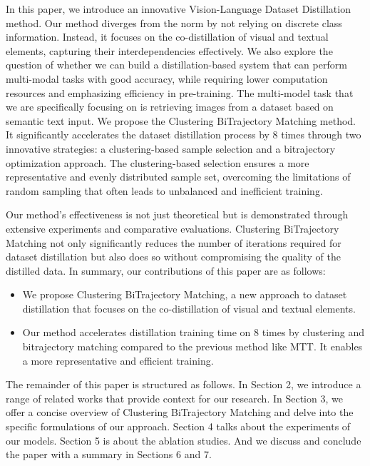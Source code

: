 \documentclass[sigconf, nonacm]{acmart}
\begin{document}
In this paper, we introduce an innovative Vision-Language Dataset Distillation method. Our method diverges from the norm by not relying on discrete class information. Instead, it focuses on the co-distillation of visual and textual elements, capturing their interdependencies effectively. We also explore the question of whether we can build a distillation-based system that can perform multi-modal tasks with good accuracy, while requiring lower computation resources and emphasizing efficiency in pre-training. The multi-model task that we are specifically focusing on is retrieving images from a dataset based on semantic text input. We propose the Clustering BiTrajectory Matching method. It significantly accelerates the dataset distillation process by 8 times through two innovative strategies: a clustering-based sample selection and a bitrajectory optimization approach. The clustering-based selection ensures a more representative and evenly distributed sample set, overcoming the limitations of random sampling that often leads to unbalanced and inefficient training.

Our method's effectiveness is not just theoretical but is demonstrated through extensive experiments and comparative evaluations. Clustering BiTrajectory Matching not only significantly reduces the number of iterations required for dataset distillation but also does so without compromising the quality of the distilled data. In summary, our contributions of this paper are as follows:
\begin{itemize}
    \item We propose Clustering BiTrajectory Matching, a new approach to dataset distillation that focuses on the co-distillation of visual and textual elements. 
    \item Our method accelerates distillation training time on 8 times by clustering and bitrajectory matching compared to the previous method like MTT\cite{G.Cazenavette}. It enables a more representative and efficient training.
\end{itemize}

The remainder of this paper is structured as follows. In Section 2, we introduce a range of related works that provide context for our research. In Section 3, we offer a concise overview of Clustering BiTrajectory Matching and delve into the specific formulations of our approach. Section 4 talks about the experiments of our models. Section 5 is about the ablation studies. And we discuss and conclude the paper with a summary in Sections 6 and 7.
\end{document}
